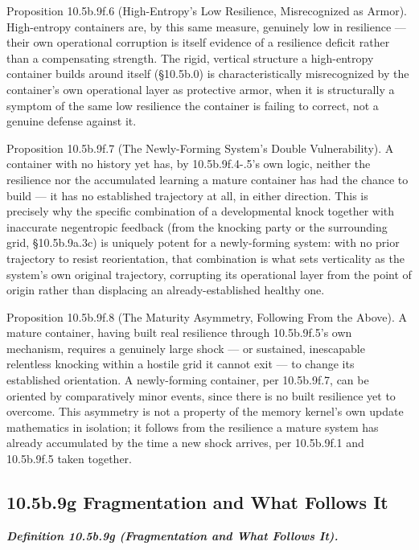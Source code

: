\documentclass[
]{article}
\begin{document}
Proposition 10.5b.9f.6 (High-Entropy's Low Resilience, Misrecognized as
Armor). High-entropy containers are, by this same measure, genuinely low
in resilience --- their own operational corruption is itself evidence of
a resilience deficit rather than a compensating strength. The rigid,
vertical structure a high-entropy container builds around itself
(§10.5b.0) is characteristically misrecognized by the container's own
operational layer as protective armor, when it is structurally a symptom
of the same low resilience the container is failing to correct, not a
genuine defense against it.

Proposition 10.5b.9f.7 (The Newly-Forming System's Double
Vulnerability). A container with no history yet has, by 10.5b.9f.4-.5's
own logic, neither the resilience nor the accumulated learning a mature
container has had the chance to build --- it has no established
trajectory at all, in either direction. This is precisely why the
specific combination of a developmental knock together with inaccurate
negentropic feedback (from the knocking party or the surrounding grid,
§10.5b.9a.3c) is uniquely potent for a newly-forming system: with no
prior trajectory to resist reorientation, that combination is what sets
verticality as the system's own original trajectory, corrupting its
operational layer from the point of origin rather than displacing an
already-established healthy one.

Proposition 10.5b.9f.8 (The Maturity Asymmetry, Following From the
Above). A mature container, having built real resilience through
10.5b.9f.5's own mechanism, requires a genuinely large shock --- or
sustained, inescapable relentless knocking within a hostile grid it
cannot exit --- to change its established orientation. A newly-forming
container, per 10.5b.9f.7, can be oriented by comparatively minor
events, since there is no built resilience yet to overcome. This
asymmetry is not a property of the memory kernel's own update
mathematics in isolation; it follows from the resilience a mature system
has already accumulated by the time a new shock arrives, per 10.5b.9f.1
and 10.5b.9f.5 taken together.

\hypertarget{b.9g-fragmentation-and-what-follows-it}{%
\subsection{10.5b.9g Fragmentation and What Follows
It}\label{b.9g-fragmentation-and-what-follows-it}}

\emph{\textbf{Definition 10.5b.9g (Fragmentation and What Follows It).}}
\end{document}
